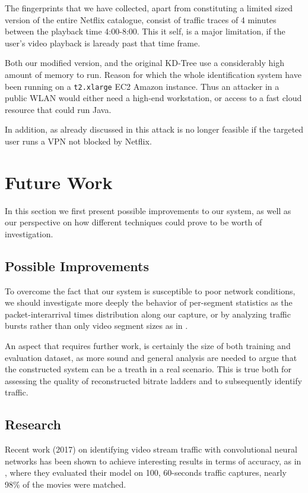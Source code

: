 The fingerprints that we have collected, apart from constituting a limited
sized version of the entire Netflix catalogue, consist of traffic traces of 4
minutes between the playback time 4:00-8:00. This it self, is a major
limitation, if the user's video playback is laready past that time frame.

Both our modified version, and the original \cite{netflix-real-time} KD-Tree
use a considerably high amount of memory to run. Reason for which the whole
identification system have been running on a \texttt{t2.xlarge} EC2 Amazon
instance. Thus an attacker in a public WLAN would either need a high-end
workstation, or access to a fast cloud resource that could run Java.

In addition, as already discussed in  this attack is no longer
feasible if the targeted user runs a VPN not blocked by Netflix. 

\newpage
\section{Future Work}

In this section we first present possible improvements to our system, as well
as our perspective on how different techniques could prove to be worth of
investigation.

\subsection{Possible Improvements}

To overcome the fact that our system is susceptible to poor network conditions,
we should investigate more deeply the behavior of per-segment statistics as the
packet-interarrival times distribution along our capture, or by analyzing
traffic bursts rather than only video segment sizes as in \cite{burst}.

An aspect that requires further work, is certainly the size of both training
and evaluation dataset, as more sound and general analysis are needed to argue
that the constructed system can be a treath in a real scenario.  This is true
both for assessing the quality of reconstructed bitrate ladders and to
subsequently identify traffic. 

\subsection{Research}

Recent work (2017) on identifying video stream traffic with convolutional neural
networks has been shown to achieve interesting results in terms of
accuracy, as in \cite{burst}, where they evaluated their model on 100,
60-seconds traffic captures, nearly 98\% of the movies were matched. 

